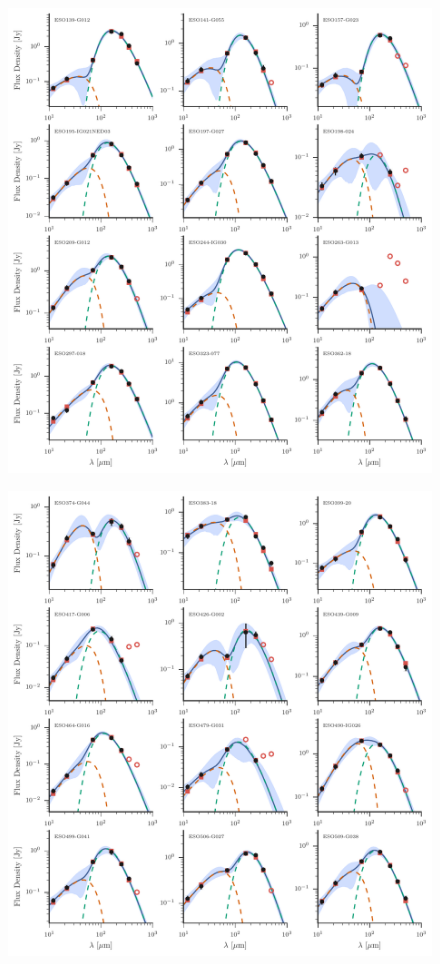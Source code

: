 \begin{figure}
\centering
\includegraphics[width=\textwidth]{figures/sedfig8}
\caption{}
\end{figure}

\begin{figure}
\centering
\includegraphics[width=\textwidth]{figures/sedfig9}
\caption{}
\end{figure}

